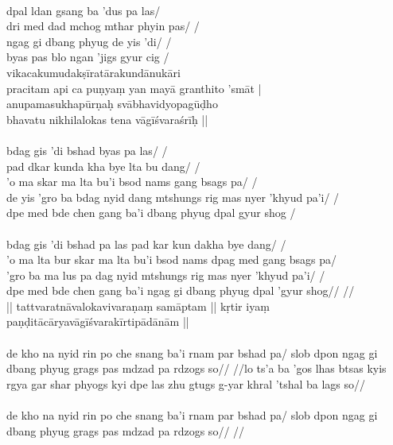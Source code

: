 \documentclass[12pt]{article}
\begin{document}
\textbf{\TVB}\\
dpal ldan gsang ba 'dus pa las/ \\
dri med dad mchog mthar phyin pas/ /\\
ngag gi dbang phyug de yis 'di/ /\\
byas pas blo ngan 'jigs gyur cig /\\

vikacakumudakṣīratārakundānukāri\\
pracitam api ca puṇyaṃ yan mayā granthito 'smāt |\\
anupamasukhapūrṇaḥ svābhavidyopagūḍho\\
bhavatu nikhilalokas tena vāgīśvaraśrīḥ ||\\

\textbf{\TVA}\\
bdag gis 'di bshad byas pa las/ /\\
pad dkar kunda kha bye lta bu dang/ /\\
'o ma skar ma lta bu'i bsod nams gang bsags pa/ /\\
de yis 'gro ba bdag nyid dang mtshungs rig mas nyer 'khyud pa'i/ /\\
dpe med bde chen gang ba'i dbang phyug dpal gyur shog /\\

\textbf{\TVB}\\
bdag gis 'di bshad pa las pad kar kun dakha bye dang/ /\\
'o ma lta bur skar ma lta bu'i bsod nams dpag med gang bsags pa/ \\
'gro ba ma lus pa dag nyid mtshungs rig mas nyer 'khyud pa'i/ /\\
dpe med bde chen gang ba'i ngag gi dbang phyug dpal 'gyur shog// //\\

|| tattvaratnāvalokavivaraṇaṃ samāptam || kṛtir iyaṃ paṇḍitācāryavāgīśvarakīrtipādānām ||\\

\textbf{\TVA}\\
de kho na nyid rin po che snang ba'i rnam par bshad pa/ slob dpon ngag gi dbang phyug grags pas mdzad pa rdzogs so// //lo ts'a ba 'gos lhas btsas kyis rgya gar shar phyogs kyi dpe las zhu gtugs g-yar khral 'tshal ba lags so//\\

\textbf{\TVB}\\
de kho na nyid rin po che snang ba'i rnam par bshad pa/ slob dpon ngag gi dbang phyug grags pas mdzad pa rdzogs so// //
\end{document}
